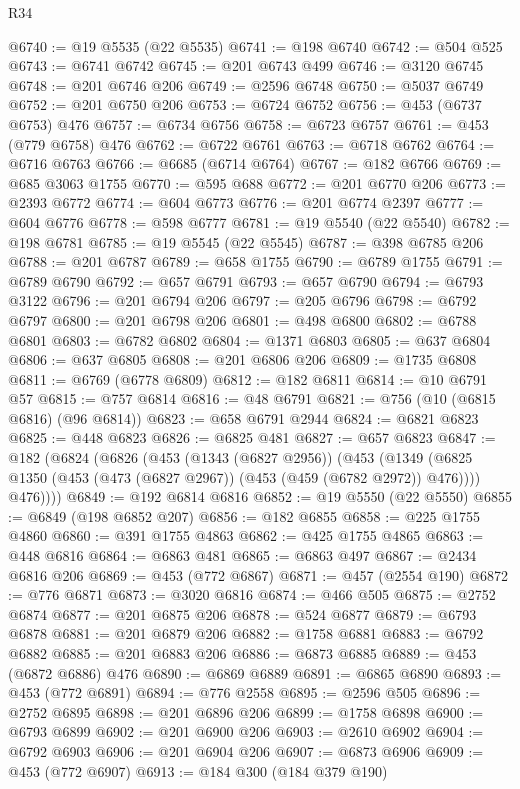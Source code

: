 \begin{lexlean}{R34}
\begin{coremodule}
@6740 := @19 @5535 (@22 @5535)
@6741 := @198 @6740
@6742 := @504 @525
@6743 := @6741 @6742
@6745 := @201 @6743 @499
@6746 := @3120 @6745
@6748 := @201 @6746 @206
@6749 := @2596 @6748
@6750 := @5037 @6749
@6752 := @201 @6750 @206
@6753 := @6724 @6752
@6756 := @453 (@6737 @6753) @476
@6757 := @6734 @6756
@6758 := @6723 @6757
@6761 := @453 (@779 @6758) @476
@6762 := @6722 @6761
@6763 := @6718 @6762
@6764 := @6716 @6763
@6766 := @6685 (@6714 @6764)
@6767 := @182 @6766
@6769 := @685 @3063 @1755
@6770 := @595 @688
@6772 := @201 @6770 @206
@6773 := @2393 @6772
@6774 := @604 @6773
@6776 := @201 @6774 @2397
@6777 := @604 @6776
@6778 := @598 @6777
@6781 := @19 @5540 (@22 @5540)
@6782 := @198 @6781
@6785 := @19 @5545 (@22 @5545)
@6787 := @398 @6785 @206
@6788 := @201 @6787
@6789 := @658 @1755
@6790 := @6789 @1755
@6791 := @6789 @6790
@6792 := @657 @6791
@6793 := @657 @6790
@6794 := @6793 @3122
@6796 := @201 @6794 @206
@6797 := @205 @6796
@6798 := @6792 @6797
@6800 := @201 @6798 @206
@6801 := @498 @6800
@6802 := @6788 @6801
@6803 := @6782 @6802
@6804 := @1371 @6803
@6805 := @637 @6804
@6806 := @637 @6805
@6808 := @201 @6806 @206
@6809 := @1735 @6808
@6811 := @6769 (@6778 @6809)
@6812 := @182 @6811
@6814 := @10 @6791 @57
@6815 := @757 @6814
@6816 := @48 @6791
@6821 := @756 (@10 (@6815 @6816) (@96 @6814))
@6823 := @658 @6791 @2944
@6824 := @6821 @6823
@6825 := @448 @6823
@6826 := @6825 @481
@6827 := @657 @6823
@6847 := @182
    (@6824
      (@6826
        (@453
          (@1343 (@6827 @2956))
          (@453
            (@1349 (@6825 @1350 (@453 (@473 (@6827 @2967)) (@453 (@459 (@6782 @2972)) @476))))
            @476))))
@6849 := @192 @6814 @6816
@6852 := @19 @5550 (@22 @5550)
@6855 := @6849 (@198 @6852 @207)
@6856 := @182 @6855
@6858 := @225 @1755 @4860
@6860 := @391 @1755 @4863
@6862 := @425 @1755 @4865
@6863 := @448 @6816
@6864 := @6863 @481
@6865 := @6863 @497
@6867 := @2434 @6816 @206
@6869 := @453 (@772 @6867)
@6871 := @457 (@2554 @190)
@6872 := @776 @6871
@6873 := @3020 @6816
@6874 := @466 @505
@6875 := @2752 @6874
@6877 := @201 @6875 @206
@6878 := @524 @6877
@6879 := @6793 @6878
@6881 := @201 @6879 @206
@6882 := @1758 @6881
@6883 := @6792 @6882
@6885 := @201 @6883 @206
@6886 := @6873 @6885
@6889 := @453 (@6872 @6886) @476
@6890 := @6869 @6889
@6891 := @6865 @6890
@6893 := @453 (@772 @6891)
@6894 := @776 @2558
@6895 := @2596 @505
@6896 := @2752 @6895
@6898 := @201 @6896 @206
@6899 := @1758 @6898
@6900 := @6793 @6899
@6902 := @201 @6900 @206
@6903 := @2610 @6902
@6904 := @6792 @6903
@6906 := @201 @6904 @206
@6907 := @6873 @6906
@6909 := @453 (@772 @6907)
@6913 := @184 @300 (@184 @379 @190)

\end{coremodule}
\end{lexlean}
